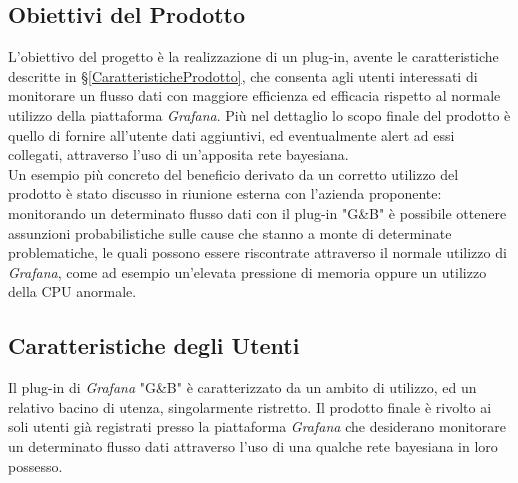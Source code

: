 \subsection{Obiettivi del Prodotto}\label{ObiettiviProdotto}
L'obiettivo del progetto è la realizzazione di un plug-in, avente le caratteristiche descritte in §\ref{CaratteristicheProdotto}, che consenta agli utenti interessati di monitorare un flusso dati con maggiore efficienza ed efficacia rispetto al normale utilizzo della piattaforma \textit{Grafana}. Più nel dettaglio lo scopo finale del prodotto è quello di fornire all'utente dati aggiuntivi, ed eventualmente alert ad essi collegati, attraverso l'uso di un'apposita rete bayesiana.\\
Un esempio più concreto del beneficio derivato da un corretto utilizzo del prodotto è stato discusso in riunione esterna con l'azienda proponente: monitorando un determinato flusso dati con il plug-in "G\&B" è possibile ottenere assunzioni probabilistiche sulle cause che stanno a monte di determinate problematiche, le quali possono essere riscontrate attraverso il normale utilizzo di \textit{Grafana}, come ad esempio un'elevata pressione di memoria oppure un utilizzo della CPU anormale.

\subsection{Caratteristiche degli Utenti}\label{CaratteristicheUtenti}
Il plug-in di \textit{Grafana} "G\&B" è caratterizzato da un ambito di utilizzo, ed un relativo bacino di utenza, singolarmente ristretto. Il prodotto finale è rivolto ai soli utenti già registrati presso la piattaforma \textit{Grafana} che desiderano monitorare un determinato flusso dati attraverso l'uso di una qualche rete bayesiana in loro possesso.

